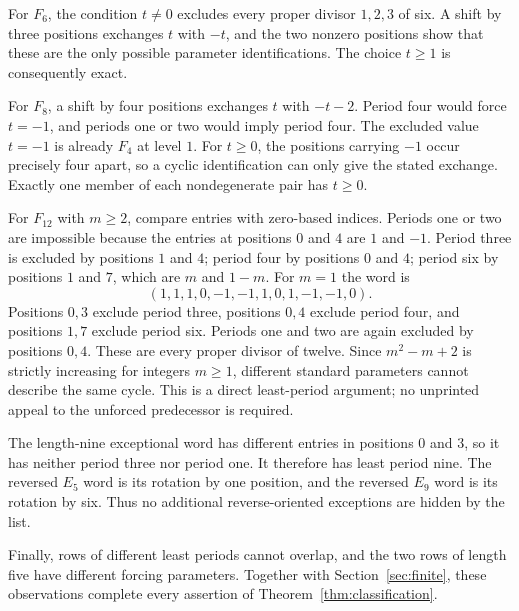 For $F_6$, the condition $t\ne0$ excludes every proper
divisor $1,2,3$ of six. A shift by three positions exchanges
$t$ with $-t$, and the two nonzero positions show that these
are the only possible parameter identifications. The choice
$t\ge1$ is consequently exact.

For $F_8$, a shift by four positions exchanges $t$ with
$-t-2$. Period four would force $t=-1$, and periods one
or two would imply period four. The excluded value $t=-1$
is already $F_4$ at level $1$. For $t\ge0$, the positions
carrying $-1$ occur precisely four apart, so a cyclic
identification can only give the stated exchange. Exactly one
member of each nondegenerate pair has $t\ge0$.

For $F_{12}$ with $m\ge2$, compare entries with zero-based
indices. Periods one or two are impossible because the entries
at positions $0$ and $4$ are $1$ and $-1$.
Period three is excluded by positions $1$ and $4$; period
four by positions $0$ and $4$; period six by positions $1$
and $7$, which are $m$ and $1-m$.
For $m=1$ the word is
\[
 (1,1,1,0,-1,-1,1,0,1,-1,-1,0).
\]
Positions $0,3$ exclude period three, positions $0,4$
exclude period four, and positions $1,7$ exclude period six.
Periods one and two are again excluded by positions $0,4$.
These are every proper divisor of twelve. Since
$m^2-m+2$ is strictly increasing for integers $m\ge1$,
different standard parameters cannot describe the same cycle.
This is a direct least-period argument; no unprinted appeal
to the unforced predecessor is required.

The length-nine exceptional word has different entries in
positions $0$ and $3$, so it has neither period three nor
period one. It therefore has least period nine. The reversed
$E_5$ word is its rotation by one position, and the reversed
$E_9$ word is its rotation by six. Thus no additional
reverse-oriented exceptions are hidden by the list.

Finally, rows of different least periods cannot overlap, and
the two rows of length five have different forcing parameters.
Together with Section~\ref{sec:finite}, these observations
complete every assertion of Theorem~\ref{thm:classification}.
